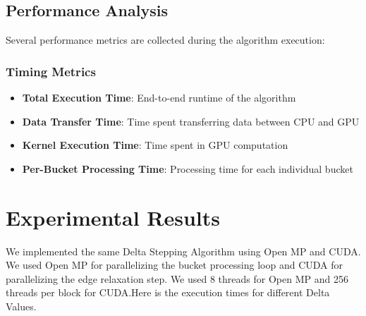 \documentclass{article}
\begin{document}
\subsection*{Performance Analysis}

Several performance metrics are collected during the algorithm execution:

\subsubsection*{Timing Metrics}
\begin{itemize}
    \item \textbf{Total Execution Time}: End-to-end runtime of the algorithm
    \item \textbf{Data Transfer Time}: Time spent transferring data between CPU and GPU
    \item \textbf{Kernel Execution Time}: Time spent in GPU computation
    \item \textbf{Per-Bucket Processing Time}: Processing time for each individual bucket
\end{itemize}

\section*{Experimental Results}

We implemented the same Delta Stepping Algorithm using Open MP and CUDA. We used Open MP for parallelizing the bucket processing loop and CUDA for parallelizing the edge relaxation step. We used 8 threads for Open MP and 256 threads per block for CUDA.Here is the execution times for different Delta Values.
\end{document}
